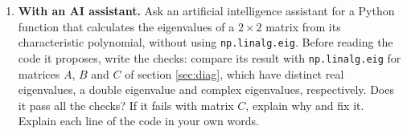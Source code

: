 \begin{enumerate}
\item \textbf{With an AI assistant.} Ask an artificial intelligence assistant for a Python function that calculates the eigenvalues of a $2\times 2$ matrix from its characteristic polynomial, without using \texttt{np.linalg.eig}. Before reading the code it proposes, write the checks: compare its result with \texttt{np.linalg.eig} for matrices $A$, $B$ and $C$ of section \ref{sec:diag}, which have distinct real eigenvalues, a double eigenvalue and complex eigenvalues, respectively. Does it pass all the checks? If it fails with matrix $C$, explain why and fix it. Explain each line of the code in your own words.
\end{enumerate}
